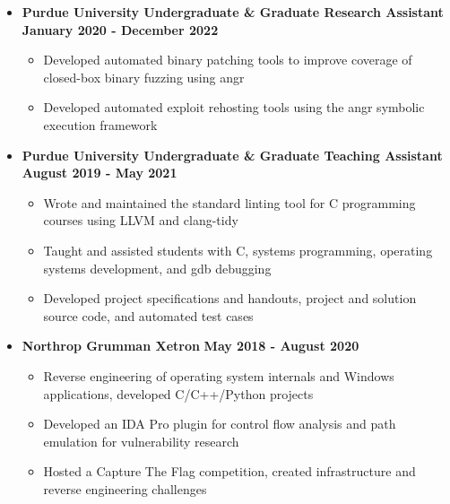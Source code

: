 \documentclass[letterpaper,10pt]{article}
\begin{document}
\begin{flushleft}
\begin{itemize}
\begin{itemize}
            \end{itemize}
        \item \textbf{Purdue University Undergraduate \& Graduate Research Assistant} \hfill \textbf{January 2020 - December 2022} \\
            \begin{itemize}
                \item Developed automated binary patching tools to improve coverage of closed-box binary fuzzing using angr \\
                \item Developed automated exploit rehosting tools using the angr symbolic execution framework \\
            \end{itemize}
        \item \textbf{Purdue University Undergraduate \& Graduate Teaching Assistant} \hfill \textbf{August 2019 - May 2021} \\
            \begin{itemize}
                \item Wrote and maintained the standard linting tool for C programming courses using LLVM and clang-tidy \\
                \item Taught and assisted students with C, systems programming, operating systems development, and gdb debugging \\
                \item Developed project specifications and handouts, project and solution source code, and automated test cases \\
            \end{itemize}
    		\item \textbf{Northrop Grumman Xetron} \hfill \textbf{May 2018 - August 2020} \\
    			\begin{itemize}
                \item Reverse engineering of operating system internals and Windows applications, developed C/C++/Python projects \\
                \item Developed an IDA Pro plugin for control flow analysis and path emulation for vulnerability research \\
                \item Hosted a Capture The Flag competition, created infrastructure and reverse engineering challenges \\

\end{itemize}
\end{itemize}
\end{flushleft}
\end{document}

